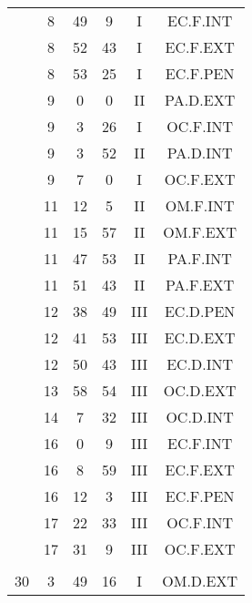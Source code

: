 \documentclass[12pt, a4paper]{article}
\begin{document}
\begin{multicols}{3}
{\begin{tabular}{c c c c c c}
	 	 	 	 & 8 & 49 & 9 & I & EC.F.INT\\%
	 	 	 	 & 8 & 52 & 43 & I & EC.F.EXT\\%
	 	 	 	 & 8 & 53 & 25 & I & EC.F.PEN\\%
	 	 	 	 & 9 & 0 & 0 & II & PA.D.EXT\\%
	 	 	 	 & 9 & 3 & 26 & I & OC.F.INT\\%
	 	 	 	 & 9 & 3 & 52 & II & PA.D.INT\\%
	 	 	 	 & 9 & 7 & 0 & I & OC.F.EXT\\%
	 	 	 	 & 11 & 12 & 5 & II & OM.F.INT\\%
	 	 	 	 & 11 & 15 & 57 & II & OM.F.EXT\\%
	 	 	 	 & 11 & 47 & 53 & II & PA.F.INT\\%
	 	 	 	 & 11 & 51 & 43 & II & PA.F.EXT\\%
	 	 	 	 & 12 & 38 & 49 & III & EC.D.PEN\\%
	 	 	 	 & 12 & 41 & 53 & III & EC.D.EXT\\%
	 	 	 	 & 12 & 50 & 43 & III & EC.D.INT\\%
	 	 	 	 & 13 & 58 & 54 & III & OC.D.EXT\\%
	 	 	 	 & 14 & 7 & 32 & III & OC.D.INT\\%
	 	 	 	 & 16 & 0 & 9 & III & EC.F.INT\\%
	 	 	 	 & 16 & 8 & 59 & III & EC.F.EXT\\%
	 	 	 	 & 16 & 12 & 3 & III & EC.F.PEN\\%
	 	 	 	 & 17 & 22 & 33 & III & OC.F.INT\\%
	 	 	 	 & 17 & 31 & 9 & III & OC.F.EXT\\%
	 	 	 	 & & & & & \\%
	 	 	 	30 & 3 & 49 & 16 & I & OM.D.EXT\\%

\end{tabular}}
\end{multicols}
\end{document}
